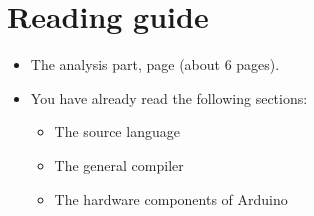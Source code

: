 \section{Reading guide}

\begin{itemize}
	\item The analysis part, page \pageref{chap:analysis} (about 6 pages).
	\item You have already read the following sections:
	\begin{itemize}
		\item The source language
		\item The general compiler
		\item The hardware components of Arduino
	\end{itemize}
\end{itemize}